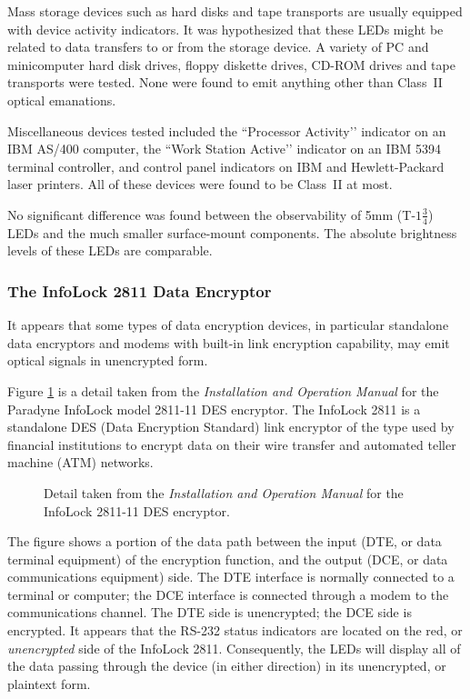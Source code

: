 \documentclass[twocolumn]{article}
\begin{document}
Mass storage devices such as hard disks and tape transports are usually equipped with device activity indicators.  It was hypothesized that these LEDs might be related to data transfers to or from the storage device.  A variety of PC and minicomputer hard disk drives, floppy diskette drives, CD-ROM drives and tape transports were tested.  None were found to emit anything other than Class~II optical emanations.
 
Miscellaneous devices tested included the ``Processor Activity’’ indicator on an IBM AS/400 computer, the ``Work Station Active’’ indicator on an IBM 5394 terminal controller, and control panel indicators on IBM and Hewlett-Packard laser printers.  All of these devices were found to be Class~II at most.
 
No significant difference was found between the observability of 5mm (T-$1\frac{3}{4}$) LEDs and the much smaller surface-mount components.  The absolute brightness levels of these LEDs are comparable.  

\subsubsection{The InfoLock 2811 Data Encryptor}

It appears that some types of data encryption devices, in particular standalone data encryptors and modems with built-in link encryption capability, may emit optical signals in unencrypted form.

Figure \ref{infolock_2811_figure} is a detail taken from the {\it Installation and Operation Manual} for the Paradyne InfoLock model 2811-11 DES encryptor.  The InfoLock 2811 is a standalone DES (Data Encryption Standard) link encryptor of the type used by financial institutions to encrypt data on their wire transfer and automated teller machine (ATM) networks.\cite{Paradyne1985}

\begin{figure}[htbp]
\centerline{\epsfysize=1.5in }
\caption{Detail taken from the {\it Installation and Operation Manual} for the InfoLock 2811-11 DES encryptor.}
\label{infolock_2811_figure}
\end{figure}

The figure shows a portion of the data path between the input (DTE, or data terminal equipment) of the encryption function, and the output (DCE, or data communications equipment) side.  The DTE interface is normally connected to a terminal or computer; the DCE interface is connected through a modem to the communications channel.  The DTE side is unencrypted; the DCE side is encrypted.  It appears that the RS-232 status indicators are located on the red, or {\it unencrypted} side of the InfoLock 2811.  Consequently, the LEDs will display all of the data passing through the device (in either direction) in its unencrypted, or plaintext form.
\end{document}
